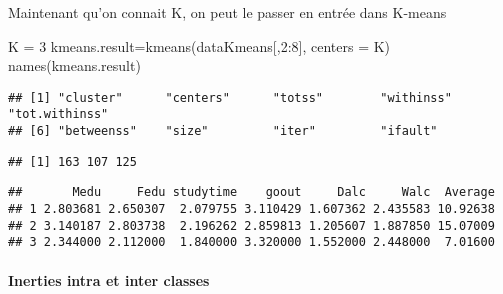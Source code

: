 \documentclass[
]{article}
\newenvironment{Shaded}{\begin{snugshade}}{\end{snugshade}}
\newcommand{\AttributeTok}[1]{\textcolor[rgb]{0.77,0.63,0.00}{#1}}
\newcommand{\CommentTok}[1]{\textcolor[rgb]{0.56,0.35,0.01}{\textit{#1}}}
\newcommand{\DecValTok}[1]{\textcolor[rgb]{0.00,0.00,0.81}{#1}}
\newcommand{\FunctionTok}[1]{\textcolor[rgb]{0.00,0.00,0.00}{#1}}
\newcommand{\NormalTok}[1]{#1}
\newcommand{\OtherTok}[1]{\textcolor[rgb]{0.56,0.35,0.01}{#1}}
\newcommand{\SpecialCharTok}[1]{\textcolor[rgb]{0.00,0.00,0.00}{#1}}
\begin{document}
Maintenant qu'on connait K, on peut le passer en entrée dans K-means

\begin{Shaded}
\begin{Highlighting}[]
\NormalTok{K }\OtherTok{=} \DecValTok{3}
\NormalTok{kmeans.result}\OtherTok{=}\FunctionTok{kmeans}\NormalTok{(dataKmeans[,}\DecValTok{2}\SpecialCharTok{:}\DecValTok{8}\NormalTok{], }\AttributeTok{centers =}\NormalTok{ K)}
\FunctionTok{names}\NormalTok{(kmeans.result)}
\end{Highlighting}
\end{Shaded}

\begin{verbatim}
## [1] "cluster"      "centers"      "totss"        "withinss"     "tot.withinss"
## [6] "betweenss"    "size"         "iter"         "ifault"
\end{verbatim}

\begin{Shaded}
\end{Shaded}

\begin{verbatim}
## [1] 163 107 125
\end{verbatim}

\begin{Shaded}
\end{Shaded}

\begin{verbatim}
##       Medu     Fedu studytime    goout     Dalc     Walc  Average
## 1 2.803681 2.650307  2.079755 3.110429 1.607362 2.435583 10.92638
## 2 3.140187 2.803738  2.196262 2.859813 1.205607 1.887850 15.07009
## 3 2.344000 2.112000  1.840000 3.320000 1.552000 2.448000  7.01600
\end{verbatim}

\begin{Shaded}
\end{Shaded}

\hypertarget{inerties-intra-et-inter-classes}{%
\paragraph{Inerties intra et inter
classes}\label{inerties-intra-et-inter-classes}}
\end{document}
